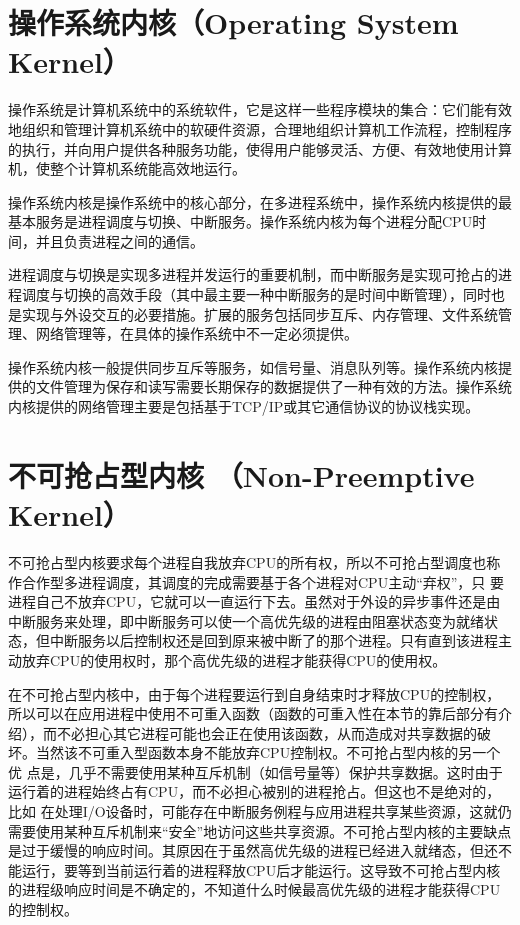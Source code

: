 \documentclass[a4paper,12pt]{report}
\begin{document}
\begin{appendix}
\section{ 操作系统内核（Operating System Kernel）}
\begin{spacing}{1.5}
   操作系统是计算机系统中的系统软件，它是这样一些程序模块的集合：它们能有效地组织和管理计算机系统中的软硬件资源，合理地组织计算机工作流程，控制程序的执行，并向用户提供各种服务功能，使得用户能够灵活、方便、有效地使用计算机，使整个计算机系统能高效地运行。

    操作系统内核是操作系统中的核心部分，在多进程系统中，操作系统内核提供的最基本服务是进程调度与切换、中断服务。操作系统内核为每个进程分配CPU时间，并且负责进程之间的通信。

    进程调度与切换是实现多进程并发运行的重要机制，而中断服务是实现可抢占的进程调度与切换的高效手段（其中最主要一种中断服务的是时间中断管理），同时也 是实现与外设交互的必要措施。扩展的服务包括同步互斥、内存管理、文件系统管理、网络管理等，在具体的操作系统中不一定必须提供。

    操作系统内核一般提供同步互斥等服务，如信号量、消息队列等。操作系统内核提供的文件管理为保存和读写需要长期保存的数据提供了一种有效的方法。操作系统内核提供的网络管理主要是包括基于TCP/IP或其它通信协议的协议栈实现。

\end{spacing}



\section{ 不可抢占型内核    （Non-Preemptive Kernel）}
\begin{spacing}{1.5}
   不可抢占型内核要求每个进程自我放弃CPU的所有权，所以不可抢占型调度也称作合作型多进程调度，其调度的完成需要基于各个进程对CPU主动“弃权”，只 要进程自己不放弃CPU，它就可以一直运行下去。虽然对于外设的异步事件还是由中断服务来处理，即中断服务可以使一个高优先级的进程由阻塞状态变为就绪状 态，但中断服务以后控制权还是回到原来被中断了的那个进程。只有直到该进程主动放弃CPU的使用权时，那个高优先级的进程才能获得CPU的使用权。

    在不可抢占型内核中，由于每个进程要运行到自身结束时才释放CPU的控制权，所以可以在应用进程中使用不可重入函数（函数的可重入性在本节的靠后部分有介 绍），而不必担心其它进程可能也会正在使用该函数，从而造成对共享数据的破坏。当然该不可重入型函数本身不能放弃CPU控制权。不可抢占型内核的另一个优 点是，几乎不需要使用某种互斥机制（如信号量等）保护共享数据。这时由于运行着的进程始终占有CPU，而不必担心被别的进程抢占。但这也不是绝对的，比如 在处理I/O设备时，可能存在中断服务例程与应用进程共享某些资源，这就仍需要使用某种互斥机制来“安全”地访问这些共享资源。不可抢占型内核的主要缺点 是过于缓慢的响应时间。其原因在于虽然高优先级的进程已经进入就绪态，但还不能运行，要等到当前运行着的进程释放CPU后才能运行。这导致不可抢占型内核 的进程级响应时间是不确定的，不知道什么时候最高优先级的进程才能获得CPU的控制权。


\end{spacing}
\end{appendix}
\end{document}
